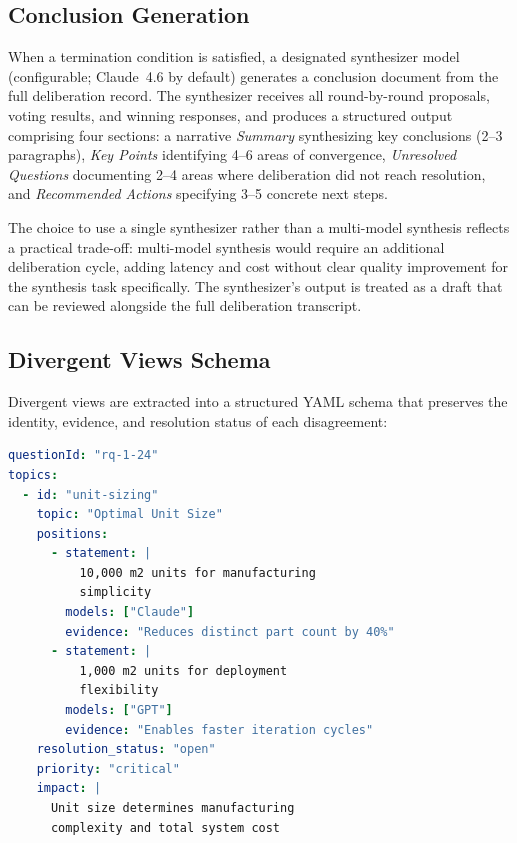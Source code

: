 \documentclass[11pt,a4paper]{article}
\begin{document}
\subsection{Conclusion Generation}
\label{sec:conclusion_generation}

When a termination condition is satisfied, a designated synthesizer model (configurable; Claude~4.6 by default) generates a conclusion document from the full deliberation record. The synthesizer receives all round-by-round proposals, voting results, and winning responses, and produces a structured output comprising four sections: a narrative \emph{Summary} synthesizing key conclusions (2--3 paragraphs), \emph{Key Points} identifying 4--6 areas of convergence, \emph{Unresolved Questions} documenting 2--4 areas where deliberation did not reach resolution, and \emph{Recommended Actions} specifying 3--5 concrete next steps.

The choice to use a single synthesizer rather than a multi-model synthesis reflects a practical trade-off: multi-model synthesis would require an additional deliberation cycle, adding latency and cost without clear quality improvement for the synthesis task specifically. The synthesizer's output is treated as a draft that can be reviewed alongside the full deliberation transcript.

\subsection{Divergent Views Schema}
\label{sec:divergent}

Divergent views are extracted into a structured YAML schema that preserves the identity, evidence, and resolution status of each disagreement:

\begin{lstlisting}[language=yaml,caption={Divergent views schema with model attribution.}]
questionId: "rq-1-24"
topics:
  - id: "unit-sizing"
    topic: "Optimal Unit Size"
    positions:
      - statement: |
          10,000 m2 units for manufacturing
          simplicity
        models: ["Claude"]
        evidence: "Reduces distinct part count by 40%"
      - statement: |
          1,000 m2 units for deployment
          flexibility
        models: ["GPT"]
        evidence: "Enables faster iteration cycles"
    resolution_status: "open"
    priority: "critical"
    impact: |
      Unit size determines manufacturing
      complexity and total system cost
\end{lstlisting}
\end{document}
